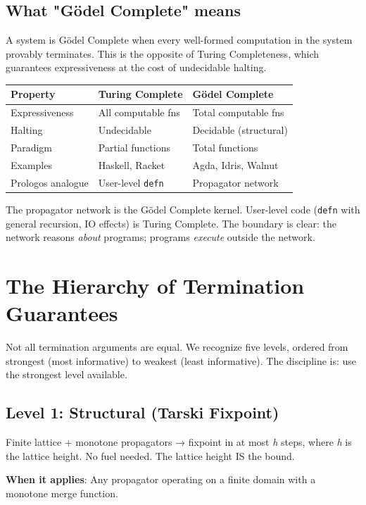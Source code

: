 \documentclass[11pt]{article}
\begin{document}
\subsection{What "Gödel Complete" means}
\label{sec:org279927d}

A system is Gödel Complete when every well-formed computation in the
system provably terminates. This is the opposite of Turing
Completeness, which guarantees expressiveness at the cost of
undecidable halting.

\begin{center}
\begin{tabular}{lll}
Property & Turing Complete & Gödel Complete\\
\hline
Expressiveness & All computable fns & Total computable fns\\
Halting & Undecidable & Decidable (structural)\\
Paradigm & Partial functions & Total functions\\
Examples & Haskell, Racket & Agda, Idris, Walnut\\
Prologos analogue & User-level \texttt{defn} & Propagator network\\
\end{tabular}
\end{center}

The propagator network is the Gödel Complete kernel. User-level code
(\texttt{defn} with general recursion, IO effects) is Turing Complete. The
boundary is clear: the network reasons \emph{about} programs; programs
\emph{execute} outside the network.
\section{The Hierarchy of Termination Guarantees}
\label{sec:org1adf136}

Not all termination arguments are equal. We recognize five levels,
ordered from strongest (most informative) to weakest (least
informative). The discipline is: use the strongest level available.
\subsection{Level 1: Structural (Tarski Fixpoint)}
\label{sec:orge82c92e}

Finite lattice + monotone propagators → fixpoint in at most \emph{h} steps,
where \emph{h} is the lattice height. No fuel needed. The lattice height IS
the bound.

\textbf{When it applies}: Any propagator operating on a finite domain with a
monotone merge function.
\end{document}

